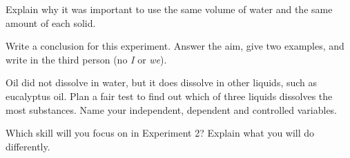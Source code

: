 \task Explain why it was important to use the same volume of water and the same amount of each solid. 
\answerbox{4cm}

\task Write a conclusion for this experiment. Answer the aim, give two examples, and write in the third person (no \emph{I} or \emph{we}). 
\answerbox{5cm}

\begin{yr8box}
\begin{keepext}
\exttask Oil did not dissolve in water, but it does dissolve in other liquids, such as eucalyptus oil. Plan a fair test to find out which of three liquids dissolves the most substances. Name your independent, dependent and controlled variables.
\answerbox{6cm}
\end{keepext}
\end{yr8box}


\begin{skillcheck}
\end{skillcheck}

\task Which skill will you focus on in Experiment 2? Explain what you will do differently.
\answerbox{5cm}
